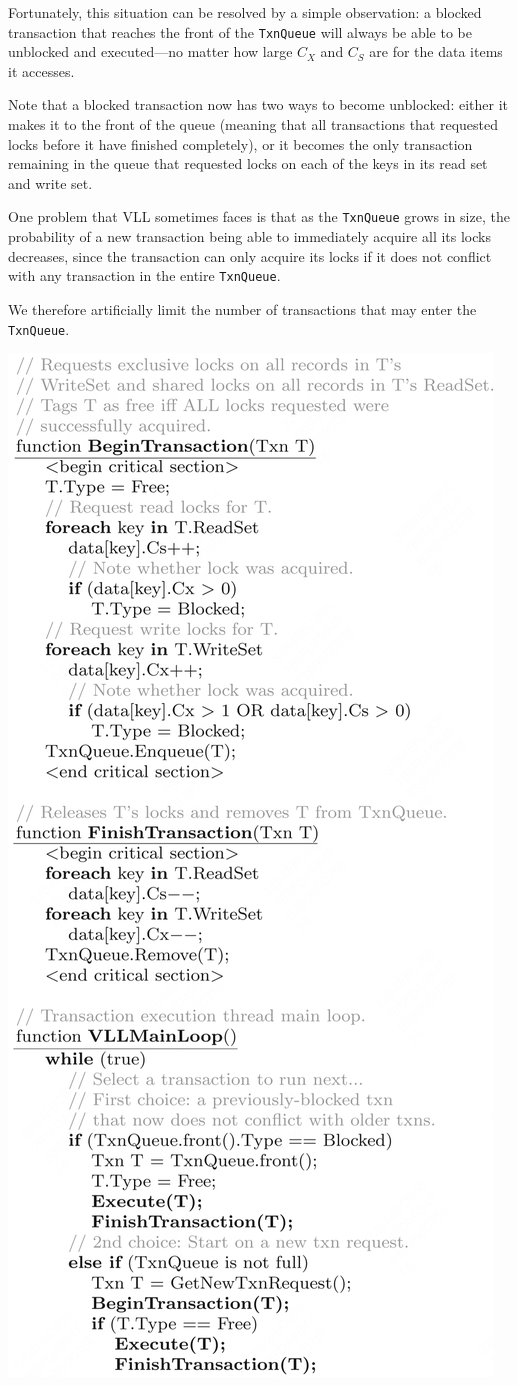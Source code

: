 \documentclass[11pt]{article}
\begin{document}
Fortunately, this situation can be resolved by a simple observation: a blocked transaction that
reaches the front of the \texttt{TxnQueue} will always be able to be unblocked and executed—no matter how large
\(C_X\) and \(C_S\) are for the data items it accesses.

Note that a blocked transaction now has two ways to become unblocked: either it makes it to the front
of the queue (meaning that all transactions that requested locks before it have finished completely),
or it becomes the only transaction remaining in the queue that requested locks on each of the keys in
its read set and write set.

One problem that VLL sometimes faces is that as the \texttt{TxnQueue} grows in size, the probability of a new
transaction being able to immediately acquire all its locks decreases, since the transaction can only
acquire its locks if it does not conflict with any transaction in the entire \texttt{TxnQueue}.

We therefore artificially limit the number of transactions that may enter the \texttt{TxnQueue}.

\begin{center}
\includegraphics[width=.7\textwidth]{../../images/papers/82.png}
\end{center}
\end{document}
